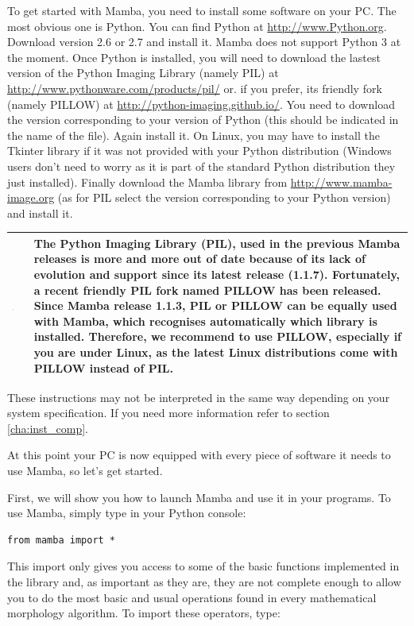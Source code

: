 \documentclass[a4paper,10pt,oneside]{article}
\newenvironment{tipBox}
{
    \begin{center}
    \begin{tabular}{ | b{0.1\textwidth} b{0.8\textwidth} | }
    \hline
    \rowcolor{lightblue}
    \includegraphics[width=0.1\textwidth]{Crystal_Clear_action_info.png} &
}
{
    \\
    \hline
    \end{tabular}
    \end{center}
}
\begin{document}
To get started with Mamba, you need to install some software on your PC. The 
most obvious one is Python. You can find Python at \url{http://www.Python.org}. 
Download version 2.6 or 2.7 and install it. Mamba does not support Python 3 at the
moment. Once Python is installed, you will need to download the lastest version
of the Python Imaging Library (namely PIL) at \url{http://www.pythonware.com/products/pil/}
or. if you prefer, its friendly fork (namely PILLOW) at \url{http://python-imaging.github.io/}.
You need to download the version corresponding to your version of Python (this
should be indicated in the name of the file). Again install it. On Linux, you may
have to install the Tkinter library if it was not provided with your Python
distribution (Windows users don't need to worry as it is part of the standard 
Python distribution they just installed). Finally download the Mamba library 
from \url{http://www.mamba-image.org} (as for PIL select the version corresponding
to your Python version) and install it.

\begin{tipBox}
The Python Imaging Library (PIL), used in the previous Mamba releases is more and more
out of date because of its lack of evolution and support since its latest release (1.1.7).
Fortunately, a recent friendly PIL fork named PILLOW has been released. Since Mamba release 1.1.3,
PIL or PILLOW can be equally used with Mamba, which recognises automatically which library is
installed. Therefore, we recommend to use PILLOW, especially if you are under Linux, as the latest
Linux distributions come with PILLOW instead of PIL.
\end{tipBox}

These instructions may not be interpreted in the same way depending on your 
system specification. If you need more information refer to section
\ref{cha:inst_comp}.

At this point your PC is now equipped with every piece of software it needs to
use Mamba, so let's get started.

First, we will show you how to launch Mamba and use it in your programs.
To use Mamba, simply type in your Python console:

\lstset{language=Python}
\begin{lstlisting}
from mamba import * 
\end{lstlisting}

This import only gives you access to some of the basic functions implemented in
the library and, as important as they are, they are not complete enough to allow
you to do the most basic and usual operations found in every mathematical
morphology algorithm. To import these operators, type:
\end{document}
